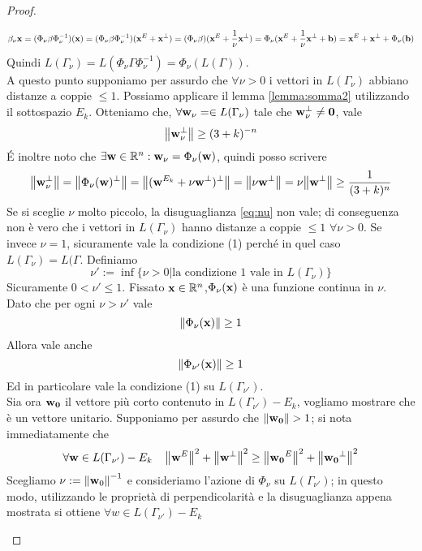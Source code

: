 \documentclass[a4paper,11pt,openright,twoside	]{book}
\begin{document}
\begin{proof}
\begin{itemize}
\[\beta_{\nu} \vb{x} = (\Phi_{\nu} \beta \Phi_{\nu}^{-1})(\vb{x}) = (\Phi_{\nu} \beta \Phi_{\nu}^{-1})(\vb{x}^E + \vb{x}^{\perp}) =  
 (\Phi_{\nu} \beta)(\vb{x}^E + \frac{1}{\nu}\vb{x}^{\perp}) =  \Phi_{\nu}(\vb{x}^E + \frac{1}{\nu}\vb{x}^{\perp} + \vb{b}) = \vb{x}^E + \vb{x}^{\perp} + \Phi_{\nu}(\vb{b}) \] 
Quindi  $L(\Gamma_{\nu})  = L(\Phi_{\nu} \Gamma \Phi_{\nu}^{-1}) = \Phi_{\nu}(L(\Gamma))$. \\
A questo punto supponiamo per assurdo che $\forall \nu >0 $ i vettori in  $L(\Gamma_{\nu})$ abbiano distanze a coppie $\leq 1$. Possiamo applicare il lemma  \ref{lemma:somma2} utilizzando il sottospazio $E_k$. Otteniamo che, $\forall \vb{w}_{\nu} = \in L(\Gamma_{\nu})$ tale che $\vb{w}_{\nu}^{\perp} \neq \vb{0}$,  vale 
\[ \norm{\vb{w}_{\nu}^{\perp}} \geq (3 + k)^{-n}\]
\'E inoltre noto che $\exists \vb{w} \in \mathbb{R}^n : \vb{w}_{\nu} = \Phi_{\nu}(\vb{w})$, quindi posso scrivere
\begin{equation}
\label{eq:nu}
\norm{\vb{w}_{\nu}^{\perp}} = \norm{\Phi_{\nu}(\vb{w})^{\perp}} = \norm{ (\vb{w}^{E_k} + \nu \vb{w}^{\perp})^{\perp}} = \norm{\nu \vb{w}^{\perp}} = \nu \norm{\vb{w}^{\perp}}\geq \frac{1}{(3 + k)^{n}}
\end{equation}
Se si sceglie $\nu$ molto piccolo, la disuguaglianza \ref{eq:nu}  non vale; di conseguenza non è vero che i vettori in  $L(\Gamma_{\nu})$ hanno distanze a coppie $\leq 1$ $\forall \nu >0$. Se invece $\nu = 1 $, sicuramente vale la condizione (1) perché in quel caso $L(\Gamma_{\nu}) = L(\Gamma $. 
Definiamo 
\[ \nu' := \inf \{\nu >0 | \textrm{la condizione 1 vale in }  L(\Gamma_{\nu}) \} \]
Sicuramente $0 < \nu' \leq 1$. Fissato $\vb{x} \in \mathbb{R}^n$,$\Phi_{\nu}(\vb{x}) $ è una funzione continua in $\nu$. \\
Dato che per ogni  $\nu > \nu ' $ vale 
\[ \norm{\Phi_{\nu}(\vb{x})} \geq 1 \]
Allora vale anche 
\[ \norm{\Phi_{\nu'}(\vb{x})} \geq 1  \]
Ed in particolare vale la condizione (1) su $L(\Gamma_{\nu'})$. \\
Sia ora $\vb{w_0}$ il vettore più corto contenuto in $L(\Gamma_{\nu'}) - E_k$, vogliamo mostrare che è un vettore unitario. 
Supponiamo per assurdo che $\norm{\vb{w_0}} > 1$; si nota immediatamente che 
\[ \forall \vb{w} \in L(\Gamma_{\nu'}) - E_k \; \; \; \; \norm{\vb{w}^E}^2 + \norm{\vb{w}^{\perp}}^2 \geq \norm{\vb{w_0}^E}^2 + \norm{\vb{w_0}^{\perp}}^2 \]
Scegliamo $\nu := \norm{\vb{w}_0}^{-1}$ e consideriamo l'azione di $\Phi_{\nu}$ su $L(\Gamma_{\nu'})$; in questo modo, utilizzando le proprietà di perpendicolarità e la disuguaglianza appena mostrata si ottiene $\forall w \in L(\Gamma_{\nu'}) - E_k$

\end{itemize}
\end{proof}
\end{document}
